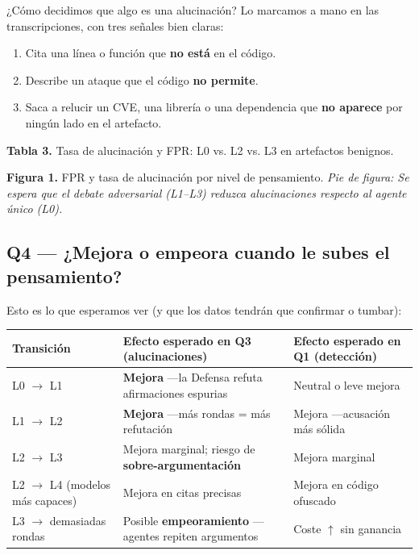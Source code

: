 \documentclass[10pt]{article}
\begin{document}
¿Cómo decidimos que algo es una alucinación? Lo marcamos a mano en las transcripciones,
con tres señales bien claras:

\begin{enumerate}[leftmargin=*]
  \item Cita una línea o función que \textbf{no está} en el código.
  \item Describe un ataque que el código \textbf{no permite}.
  \item Saca a relucir un CVE, una librería o una dependencia que \textbf{no aparece} por
  ningún lado en el artefacto.
\end{enumerate}

\textbf{Tabla 3.} Tasa de alucinación y FPR: L0 vs. L2 vs. L3 en artefactos benignos.

\textbf{Figura 1.} FPR y tasa de alucinación por nivel de pensamiento. \textit{Pie de
figura: Se espera que el debate adversarial (L1--L3) reduzca alucinaciones respecto al
agente único (L0).}

\subsection{Q4 --- ¿Mejora o empeora cuando le subes el pensamiento?}

Esto es lo que esperamos ver (y que los datos tendrán que confirmar o tumbar):

\begin{table}[h]
\centering
\small
\begin{tabularx}{\textwidth}{@{}L{3.5cm} X X@{}}
\toprule
Transición & Efecto esperado en Q3 (alucinaciones) & Efecto esperado en Q1 (detección) \\
\midrule
L0 $\rightarrow$ L1 & \textbf{Mejora} ---la Defensa refuta afirmaciones espurias &
Neutral o leve mejora \\
L1 $\rightarrow$ L2 & \textbf{Mejora} ---más rondas = más refutación & Mejora
---acusación más sólida \\
L2 $\rightarrow$ L3 & Mejora marginal; riesgo de \textbf{sobre-argumentación} & Mejora
marginal \\
L2 $\rightarrow$ L4 (modelos más capaces) & Mejora en citas precisas & Mejora en código
ofuscado \\
L3 $\rightarrow$ demasiadas rondas & Posible \textbf{empeoramiento} ---agentes repiten
argumentos & Coste $\uparrow$ sin ganancia \\
\bottomrule
\end{tabularx}
\end{table}
\end{document}
